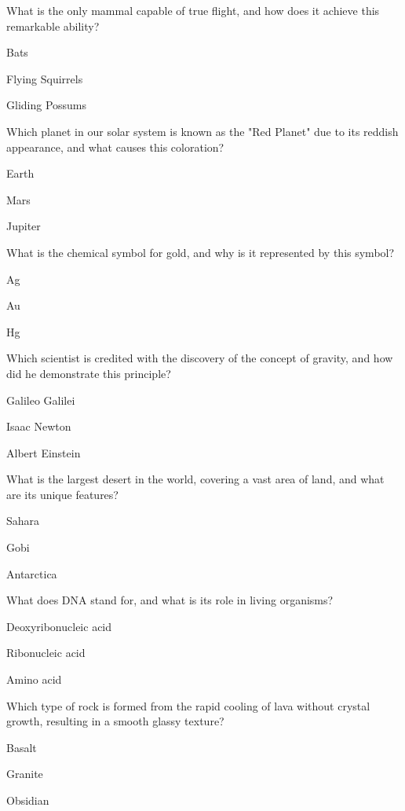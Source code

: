 
\begin{enhancedmcq}{What is the only mammal capable of true flight, and how does it achieve this remarkable ability?}
\item Bats
\item Flying Squirrels
\item Gliding Possums

\end{enhancedmcq}
\begin{enhancedmcq}{Which planet in our solar system is known as the "Red Planet" due to its reddish appearance, and what causes this coloration?}
\item Earth
\item Mars
\item Jupiter

\end{enhancedmcq}
\begin{enhancedmcq}{What is the chemical symbol for gold, and why is it represented by this symbol?}
\item Ag
\item Au
\item Hg

\end{enhancedmcq}
\begin{enhancedmcq}{Which scientist is credited with the discovery of the concept of gravity, and how did he demonstrate this principle?}
\item Galileo Galilei
\item Isaac Newton
\item Albert Einstein

\end{enhancedmcq}
\begin{enhancedmcq}{What is the largest desert in the world, covering a vast area of land, and what are its unique features?}
\item Sahara
\item Gobi
\item Antarctica

\end{enhancedmcq}
\begin{enhancedmcq}{What does DNA stand for, and what is its role in living organisms?}
\item Deoxyribonucleic acid
\item Ribonucleic acid
\item Amino acid

\end{enhancedmcq}
\begin{enhancedmcq}{Which type of rock is formed from the rapid cooling of lava without crystal growth, resulting in a smooth glassy texture?}
\item Basalt
\item Granite
\item Obsidian

\end{enhancedmcq}

